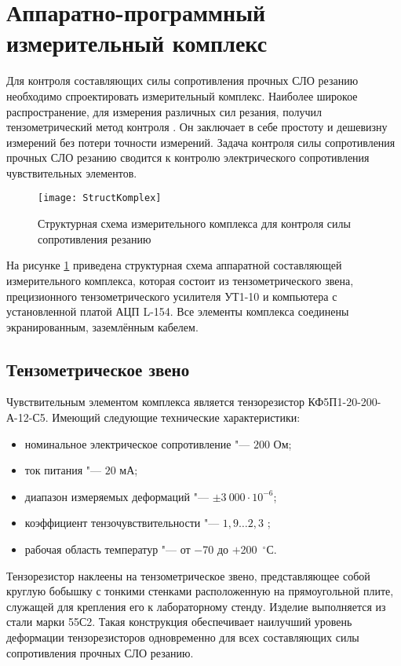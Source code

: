 \section{Аппаратно-программный измерительный комплекс}\label{sect2_3}

Для контроля составляющих силы сопротивления прочных СЛО резанию необходимо спроектировать измерительный комплекс. Наиболее широкое распространение, для измерения различных сил резания, получил тензометрический метод контроля \todo{[ссылки]}. Он заключает в себе простоту и дешевизну измерений без потери точности измерений. Задача контроля силы сопротивления прочных СЛО резанию сводится к контролю электрического сопротивления чувствительных элементов.

\begin{figure} [htbp]
	\center
	\texttt{[image: StructKomplex]}
	\caption{Структурная схема измерительного комплекса для контроля силы сопротивления резанию} 
	\label{img:StructKomplex}  
\end{figure}

На рисунке \ref{img:StructKomplex} приведена структурная схема аппаратной составляющей измерительного комплекса, которая состоит из тензометрического звена, прецизионного тензометрического усилителя УТ1-10 и компьютера с установленной платой АЦП L-154. Все элементы комплекса соединены экранированным, заземлённым кабелем.

\subsection{Тензометрическое звено}\label{subsect2_3_1}

Чувствительным элементом комплекса является тензорезистор КФ5П1-20-200-А-12-С5. Имеющий следующие технические характеристики: 
\begin{itemize}
	\item номинальное электрическое сопротивление "--- $200$ Ом;
	\item ток питания "--- $20$ мА;
	\item диапазон измеряемых деформаций "--- $\pm3~000\cdot10^{-6}$;
	\item коэффициент тензочувствительности "--- $1,9\ldots2,3$ ;
	\item рабочая область температур "--- от $-$70 до $+$200~${}^\circ$С.
\end{itemize}

Тензорезистор наклеены на тензометрическое звено, представляющее собой круглую бобышку с тонкими стенками расположенную на прямоугольной плите, служащей для крепления его к лабораторному стенду. Изделие выполняется из стали марки 55С2. Такая конструкция обеспечивает наилучший уровень деформации тензорезисторов одновременно для всех составляющих силы сопротивления прочных СЛО резанию.

